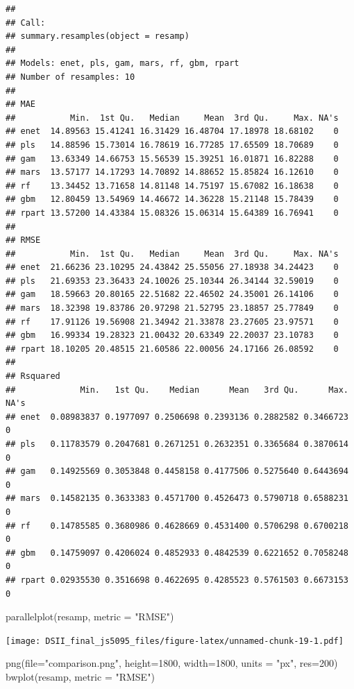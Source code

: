 \documentclass[
]{article}
\newenvironment{Shaded}{\begin{snugshade}}{\end{snugshade}}
\newcommand{\AttributeTok}[1]{\textcolor[rgb]{0.77,0.63,0.00}{#1}}
\newcommand{\DecValTok}[1]{\textcolor[rgb]{0.00,0.00,0.81}{#1}}
\newcommand{\FunctionTok}[1]{\textcolor[rgb]{0.00,0.00,0.00}{#1}}
\newcommand{\NormalTok}[1]{#1}
\newcommand{\StringTok}[1]{\textcolor[rgb]{0.31,0.60,0.02}{#1}}
\begin{document}
\begin{verbatim}
## 
## Call:
## summary.resamples(object = resamp)
## 
## Models: enet, pls, gam, mars, rf, gbm, rpart 
## Number of resamples: 10 
## 
## MAE 
##           Min.  1st Qu.   Median     Mean  3rd Qu.     Max. NA's
## enet  14.89563 15.41241 16.31429 16.48704 17.18978 18.68102    0
## pls   14.88596 15.73014 16.78619 16.77285 17.65509 18.70689    0
## gam   13.63349 14.66753 15.56539 15.39251 16.01871 16.82288    0
## mars  13.57177 14.17293 14.70892 14.88652 15.85824 16.12610    0
## rf    13.34452 13.71658 14.81148 14.75197 15.67082 16.18638    0
## gbm   12.80459 13.54969 14.46672 14.36228 15.21148 15.78439    0
## rpart 13.57200 14.43384 15.08326 15.06314 15.64389 16.76941    0
## 
## RMSE 
##           Min.  1st Qu.   Median     Mean  3rd Qu.     Max. NA's
## enet  21.66236 23.10295 24.43842 25.55056 27.18938 34.24423    0
## pls   21.69353 23.36433 24.10026 25.10344 26.34144 32.59019    0
## gam   18.59663 20.80165 22.51682 22.46502 24.35001 26.14106    0
## mars  18.32398 19.83786 20.97298 21.52795 23.18857 25.77849    0
## rf    17.91126 19.56908 21.34942 21.33878 23.27605 23.97571    0
## gbm   16.99334 19.28323 21.00432 20.63349 22.20037 23.10783    0
## rpart 18.10205 20.48515 21.60586 22.00056 24.17166 26.08592    0
## 
## Rsquared 
##             Min.   1st Qu.    Median      Mean   3rd Qu.      Max. NA's
## enet  0.08983837 0.1977097 0.2506698 0.2393136 0.2882582 0.3466723    0
## pls   0.11783579 0.2047681 0.2671251 0.2632351 0.3365684 0.3870614    0
## gam   0.14925569 0.3053848 0.4458158 0.4177506 0.5275640 0.6443694    0
## mars  0.14582135 0.3633383 0.4571700 0.4526473 0.5790718 0.6588231    0
## rf    0.14785585 0.3680986 0.4628669 0.4531400 0.5706298 0.6700218    0
## gbm   0.14759097 0.4206024 0.4852933 0.4842539 0.6221652 0.7058248    0
## rpart 0.02935530 0.3516698 0.4622695 0.4285523 0.5761503 0.6673153    0
\end{verbatim}

\begin{Shaded}
\begin{Highlighting}[]
\FunctionTok{parallelplot}\NormalTok{(resamp, }\AttributeTok{metric =} \StringTok{"RMSE"}\NormalTok{)}
\end{Highlighting}
\end{Shaded}

\texttt{[image: DSII\_final\_js5095\_files/figure-latex/unnamed-chunk-19-1.pdf]}

\begin{Shaded}
\begin{Highlighting}[]
\FunctionTok{png}\NormalTok{(}\AttributeTok{file=}\StringTok{"comparison.png"}\NormalTok{, }\AttributeTok{height=}\DecValTok{1800}\NormalTok{, }\AttributeTok{width=}\DecValTok{1800}\NormalTok{, }\AttributeTok{units =} \StringTok{"px"}\NormalTok{, }\AttributeTok{res=}\DecValTok{200}\NormalTok{)}
\FunctionTok{bwplot}\NormalTok{(resamp, }\AttributeTok{metric =} \StringTok{"RMSE"}\NormalTok{)}
\end{Highlighting}
\end{Shaded}
\end{document}
